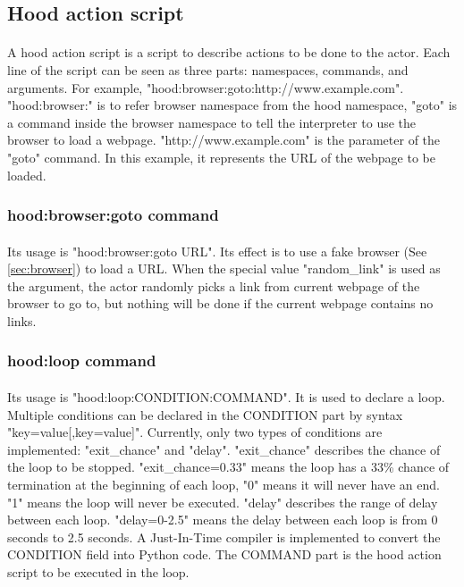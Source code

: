 \documentclass[mscthesis]{usiinfthesis}
\begin{document}
\subsection{Hood action script}
\paragraph{}
A hood action script is a script to describe actions to be done to the actor. Each line of the script can be seen as three parts: namespaces, commands, and arguments. For example, \newline "hood:browser:goto:http://www.example.com". "hood:browser:" is to refer browser namespace from the hood namespace, "goto" is a command inside the browser namespace to tell the interpreter to use the browser to load a webpage. "http://www.example.com" is the parameter of the "goto" command. In this example, it represents the URL of the webpage to be loaded.
\subsubsection{hood:browser:goto command}
\paragraph{}
Its usage is "hood:browser:goto URL". Its effect is to use a fake browser (See \cref{sec:browser}) to load a URL. When the special value "random\_link" is used as the argument, the actor randomly picks a link from current webpage of the browser to go to, but nothing will be done if the current webpage contains no links.
\subsubsection{hood:loop command}
\paragraph{}
Its usage is "hood:loop:CONDITION:COMMAND". It is used to declare a loop. Multiple conditions can be declared in the CONDITION part by syntax "key=value[,key=value]". Currently, only two types of conditions are implemented: "exit\_chance" and "delay". "exit\_chance" describes the chance of the loop to be stopped. "exit\_chance=0.33" means the loop has a 33\% chance of termination at the beginning of each loop, "0" means it will never have an end. "1" means the loop will never be executed. "delay" describes the range of delay between each loop. "delay=0-2.5" means the delay between each loop is from 0 seconds to 2.5 seconds. A Just-In-Time compiler is implemented to convert the CONDITION field into Python code. The COMMAND part is the hood action script to be executed in the loop.
\end{document}
